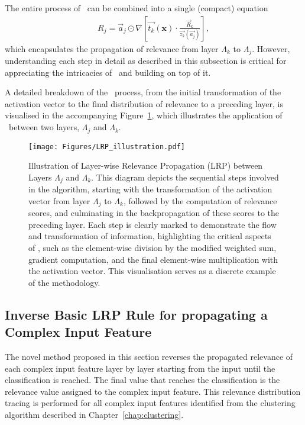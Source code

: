 The entire process of \LRP\ can  be combined into a single (compact) equation
\begin{eqnarray*}
R_{j}= \vec{a}_{j} \odot \nabla\left [\vec{t_{k}}(\boldsymbol{x}) \cdot \frac{\vec{R}_k}{\vec{z_k}(\vec{a_j})}\right],
\end{eqnarray*}
which encapsulates the propagation of relevance from layer $\Lambda_k$ to $\Lambda_j$. However, understanding each step in detail as described in this subsection is critical for appreciating the intricacies of \LRP\ and building on top of it. 


A detailed breakdown of the \LRP\ process, from the initial transformation of the activation vector to the final distribution of relevance to a preceding layer, is visualised in the accompanying Figure~\ref{Fig:LRP_breakdown}, which illustrates the application of \LRP\ between two layers, $\Lambda_j$ and $\Lambda_k$. 
\begin{figure}[ht!]
\begin{center}
\texttt{[image: Figures/LRP\_illustration.pdf]}
\end{center}
\caption{Illustration of Layer-wise Relevance Propagation (LRP) between Layers $\Lambda_j$ and $\Lambda_k$. This diagram depicts the sequential steps involved in the \LRP\/ algorithm, starting with the transformation of the activation vector from layer $\Lambda_j$ to $\Lambda_k$, followed by the computation of relevance scores, and culminating in the backpropagation of these scores to the preceding layer. Each step is clearly marked to demonstrate the flow and transformation of information, highlighting the critical aspects of \LRP\/, such as the element-wise division by the modified weighted sum, gradient computation, and the final element-wise multiplication with the activation vector. This visualisation serves as a discrete example of the methodology.}
\label{Fig:LRP_breakdown}
\end{figure} 


\subsection{Inverse Basic LRP Rule for propagating a Complex Input Feature}
\label{rev_LRP}
The novel method proposed in this section reverses the propagated relevance of each complex input feature layer by layer starting from the input until the classification is reached. The final value that reaches the classification is the relevance value assigned to the complex input feature. This relevance distribution tracing is performed for all complex input features identified from the clustering algorithm described in Chapter~\ref{chap:clustering}. 


